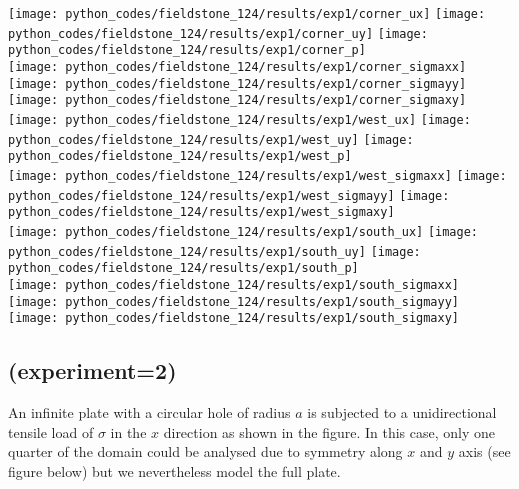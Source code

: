\begin{center}
\texttt{[image: python\_codes/fieldstone\_124/results/exp1/corner\_ux]}
\texttt{[image: python\_codes/fieldstone\_124/results/exp1/corner\_uy]}
\texttt{[image: python\_codes/fieldstone\_124/results/exp1/corner\_p]}\\
\texttt{[image: python\_codes/fieldstone\_124/results/exp1/corner\_sigmaxx]}
\texttt{[image: python\_codes/fieldstone\_124/results/exp1/corner\_sigmayy]}
\texttt{[image: python\_codes/fieldstone\_124/results/exp1/corner\_sigmaxy]}\\
\texttt{[image: python\_codes/fieldstone\_124/results/exp1/west\_ux]}
\texttt{[image: python\_codes/fieldstone\_124/results/exp1/west\_uy]}
\texttt{[image: python\_codes/fieldstone\_124/results/exp1/west\_p]}\\
\texttt{[image: python\_codes/fieldstone\_124/results/exp1/west\_sigmaxx]}
\texttt{[image: python\_codes/fieldstone\_124/results/exp1/west\_sigmayy]}
\texttt{[image: python\_codes/fieldstone\_124/results/exp1/west\_sigmaxy]}\\
\texttt{[image: python\_codes/fieldstone\_124/results/exp1/south\_ux]}
\texttt{[image: python\_codes/fieldstone\_124/results/exp1/south\_uy]}
\texttt{[image: python\_codes/fieldstone\_124/results/exp1/south\_p]}\\
\texttt{[image: python\_codes/fieldstone\_124/results/exp1/south\_sigmaxx]}
\texttt{[image: python\_codes/fieldstone\_124/results/exp1/south\_sigmayy]}
\texttt{[image: python\_codes/fieldstone\_124/results/exp1/south\_sigmaxy]}
\end{center}






\newpage
\subsection*{\textcite{rama16} (experiment=2)}

An infinite plate with a circular hole of radius $a$  
is subjected to a unidirectional tensile load of $\sigma$ in the $x$ direction as shown
in the figure. In this case, only one quarter of the domain could be analysed due
to symmetry along $x$ and $y$ axis (see figure below) but we nevertheless model the full plate.

